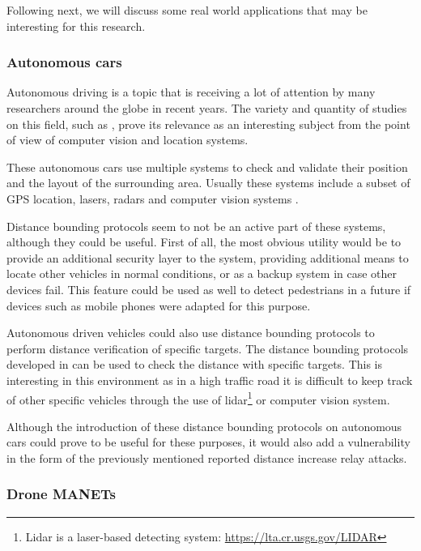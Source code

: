 \documentclass{article}
\begin{document}
Following next, we will discuss some real world applications that may be interesting for this research.

\subsubsection{Autonomous cars}

Autonomous driving is a topic that is receiving a lot of attention by many researchers around the globe in recent years. The variety and quantity of studies on this field, such as \cite{franke1999autonomous,continentalautonomous,levinsontowards,geiger2012we}, prove its relevance as an interesting subject from the point of view of computer vision and location systems.

These autonomous cars use multiple systems to check and validate their position and the layout of the surrounding area. Usually these systems include a subset of GPS location, lasers, radars and computer vision systems \cite{continentalautonomous,levinsontowards}.

Distance bounding protocols seem to not be an active part of these systems, although they could be useful. First of all, the most obvious utility would be to provide an additional security layer to the system, providing additional means to locate other vehicles in normal conditions, or as a backup system in case other devices fail. This feature could be used as well to detect pedestrians in a future if devices such as mobile phones were adapted for this purpose.

Autonomous driven vehicles could also use distance bounding protocols to perform distance verification of specific targets. The distance bounding protocols developed in  \cite{rasmussen2010realization, capkun2006secure} can be used to check the distance with specific targets. This is interesting in this environment as in a high traffic road it is difficult to keep track of other specific vehicles through the use of lidar\footnote{Lidar is a laser-based detecting system: \url{https://lta.cr.usgs.gov/LIDAR}} or computer vision system.

Although the introduction of these distance bounding protocols on autonomous cars could prove to be useful for these purposes, it would also add a vulnerability in the form of the previously mentioned reported distance increase relay attacks.


\subsubsection{Drone MANETs}
\end{document}
